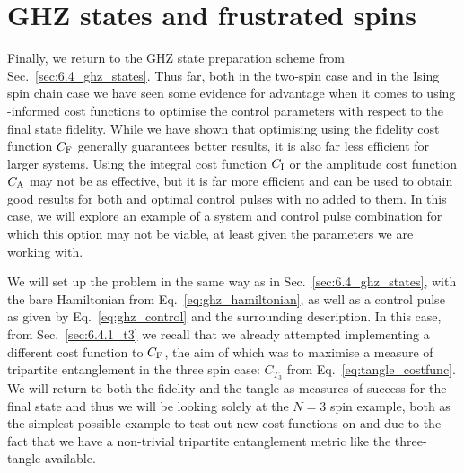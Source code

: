 \section{GHZ states and frustrated spins}\label{sec:7.3_ghz_ho}

Finally, we return to the GHZ state preparation scheme from Sec.~\ref{sec:6.4_ghz_states}. Thus far, both in the two-spin case and in the Ising spin chain case we have seen some evidence for advantage when it comes to using -informed cost functions to optimise the control parameters with respect to the final state fidelity. While we have shown that optimising using the fidelity cost function $C_{\rm F}$ generally guarantees better results, it is also far less efficient for larger systems. Using the integral cost function $C_{\rm I}$ or the amplitude cost function $C_{\rm A}$ may not be as effective, but it is far more efficient and can be used to obtain good results for both  and optimal control pulses with no  added to them. In this case, we will explore an example of a system and control pulse combination for which this option may not be viable, at least given the parameters we are working with.

We will set up the problem in the same way as in Sec.~\ref{sec:6.4_ghz_states}, with the bare Hamiltonian from Eq.~\eqref{eq:ghz_hamiltonian}, as well as a  control pulse as given by Eq.~\eqref{eq:ghz_control} and the surrounding description. In this case, from Sec.~\ref{sec:6.4.1_t3} we recall that we already attempted implementing a different cost function to $C_{\rm F}$, the aim of which was to maximise a measure of tripartite entanglement in the three spin case: $C_{T_3}$ from Eq.~\eqref{eq:tangle_costfunc}. We will return to both the fidelity and the tangle as measures of success for the final state and thus we will be looking solely at the $N=3$ spin example, both as the simplest possible example to test out new cost functions on and due to the fact that we have a non-trivial tripartite entanglement metric like the three-tangle available.

